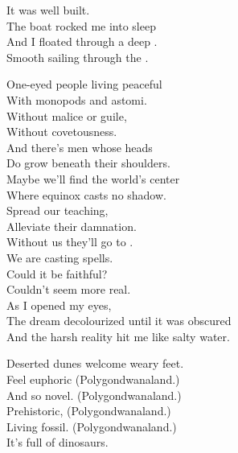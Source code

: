 It was well built. \\
The boat rocked me into sleep \\
And I floated through a deep . \\
Smooth sailing through the . \\


One-eyed people living peaceful \\
With monopods and astomi. \\
Without malice or guile, \\
Without covetousness. \\

And there's men whose heads \\
Do grow beneath their shoulders. \\
Maybe we'll find the world's center \\
Where equinox casts no shadow. \\

Spread our teaching, \\
Alleviate their damnation. \\
Without us they'll go to . \\
We are casting spells. \\

Could it be faithful? \\
Couldn't seem more real. \\
As I opened my eyes, \\
The dream decolourized until it was obscured \\
And the harsh reality hit me like salty water. \\





Deserted dunes welcome weary feet. \\
Feel euphoric (Polygondwanaland.) \\
And so novel. (Polygondwanaland.) \\
Prehistoric, (Polygondwanaland.) \\
Living fossil. (Polygondwanaland.) \\

It's full of dinosaurs. \\

